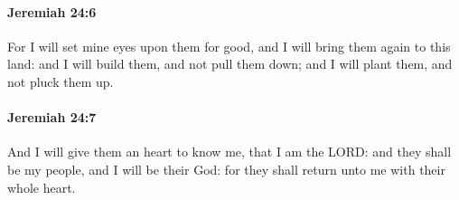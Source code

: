		\paragraph{Jeremiah 24:6} %
			\label{JEREMIAH-24-6}

			For I will set mine eyes upon them for good, and I will bring them again to this land: and I will build them, and not pull them down; and I will plant them, and not pluck them up.


		\paragraph{Jeremiah 24:7} %
			\label{JEREMIAH-24-7}

			And I will give them an heart to know me, that I am the LORD: and they shall be my people, and I will be their God: for they shall return unto me with their whole heart.


